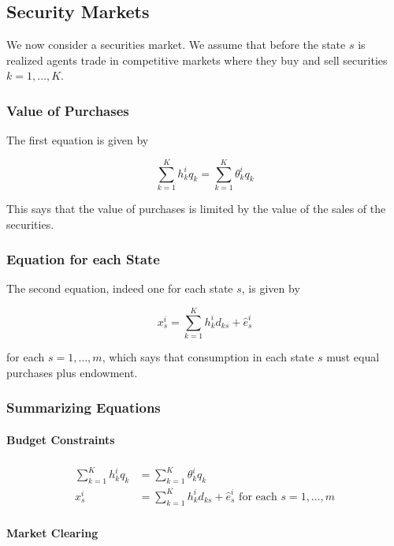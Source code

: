 \documentclass[10pt]{article}
\begin{document}
\subsection{Security Markets}

We now consider a securities market.
We assume that before the state $s$ is realized agents trade 
in competitive markets where they buy and sell securities $k=1, \ldots, K$.

\subsubsection{Value of Purchases}

The first equation is given by

$$
\sum_{k=1}^K h_k^i q_k=\sum_{k=1}^K \theta_k^i q_k
$$

This says that the value of purchases is 
limited by the value of 
the sales of the securities.

\subsubsection{Equation for each State}

The second equation, indeed one for each state $s$, is given by

$$
x_s^i=\sum_{k=1}^K h_k^i d_{k s}+\hat{e}_s^i
$$

for each $s=1, \ldots, m$,
which says that consumption in each state $s$
must equal purchases plus endowment.

\subsubsection{Summarizing Equations}

\paragraph{Budget Constraints}

\begin{align}
    \begin{aligned}
        \sum_{k=1}^K h_k^i q_k & =\sum_{k=1}^K \theta_k^i q_k \\
        x_s^i & =\sum_{k=1}^K h_k^i d_{k s}+\hat{e}_s^i \text { for each } s=1, \ldots, m
        \end{aligned}
\end{align}

\paragraph{Market Clearing}
\end{document}
